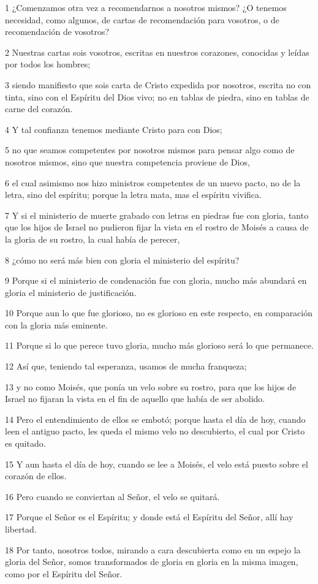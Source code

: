 \par 1 ¿Comenzamos otra vez a recomendarnos a nosotros mismos? ¿O tenemos necesidad, como algunos, de cartas de recomendación para vosotros, o de recomendación de vosotros?
\par 2 Nuestras cartas sois vosotros, escritas en nuestros corazones, conocidas y leídas por todos los hombres;
\par 3 siendo manifiesto que sois carta de Cristo expedida por nosotros, escrita no con tinta, sino con el Espíritu del Dios vivo; no en tablas de piedra, sino en tablas de carne del corazón.
\par 4 Y tal confianza tenemos mediante Cristo para con Dios;
\par 5 no que seamos competentes por nosotros mismos para pensar algo como de nosotros mismos, sino que nuestra competencia proviene de Dios,
\par 6 el cual asimismo nos hizo ministros competentes de un nuevo pacto, no de la letra, sino del espíritu; porque la letra mata, mas el espíritu vivifica.
\par 7 Y si el ministerio de muerte grabado con letras en piedras fue con gloria, tanto que los hijos de Israel no pudieron fijar la vista en el rostro de Moisés a causa de la gloria de su rostro, la cual había de perecer,
\par 8 ¿cómo no será más bien con gloria el ministerio del espíritu?
\par 9 Porque si el ministerio de condenación fue con gloria, mucho más abundará en gloria el ministerio de justificación.
\par 10 Porque aun lo que fue glorioso, no es glorioso en este respecto, en comparación con la gloria más eminente.
\par 11 Porque si lo que perece tuvo gloria, mucho más glorioso será lo que permanece.
\par 12 Así que, teniendo tal esperanza, usamos de mucha franqueza;
\par 13 y no como Moisés, que ponía un velo sobre su rostro, para que los hijos de Israel no fijaran la vista en el fin de aquello que había de ser abolido.
\par 14 Pero el entendimiento de ellos se embotó; porque hasta el día de hoy, cuando leen el antiguo pacto, les queda el mismo velo no descubierto, el cual por Cristo es quitado.
\par 15 Y aun hasta el día de hoy, cuando se lee a Moisés, el velo está puesto sobre el corazón de ellos.
\par 16 Pero cuando se conviertan al Señor, el velo se quitará.
\par 17 Porque el Señor es el Espíritu; y donde está el Espíritu del Señor, allí hay libertad.
\par 18 Por tanto, nosotros todos, mirando a cara descubierta como en un espejo la gloria del Señor, somos transformados de gloria en gloria en la misma imagen, como por el Espíritu del Señor.

